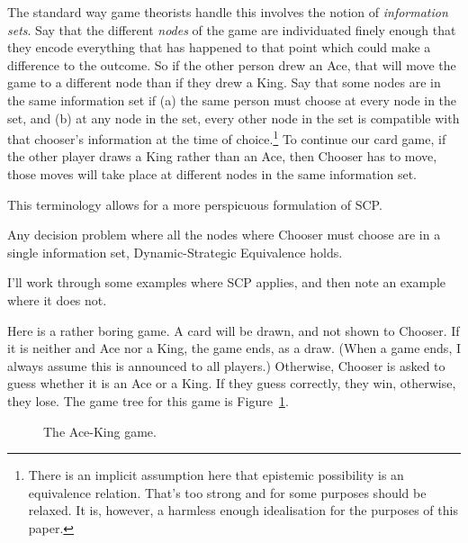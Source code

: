 \documentclass[
  10pt,
  letterpaper,
  DIV=11,
  numbers=noendperiod,
  twoside]{scrartcl}
\providecommand{\tightlist}{%
  \setlength{\itemsep}{0pt}\setlength{\parskip}{0pt}}\usepackage{longtable,booktabs,array}
\begin{document}
The standard way game theorists handle this involves the notion of
\emph{information sets}. Say that the different \emph{nodes} of the game
are individuated finely enough that they encode everything that has
happened to that point which could make a difference to the outcome. So
if the other person drew an Ace, that will move the game to a different
node than if they drew a King. Say that some nodes are in the same
information set if (a) the same person must choose at every node in the
set, and (b) at any node in the set, every other node in the set is
compatible with that chooser's information at the time of
choice.\footnote{There is an implicit assumption here that epistemic
  possibility is an equivalence relation. That's too strong and for some
  purposes should be relaxed. It is, however, a harmless enough
  idealisation for the purposes of this paper.} To continue our card
game, if the other player draws a King rather than an Ace, then Chooser
has to move, those moves will take place at different nodes in the same
information set.

This terminology allows for a more perspicuous formulation of SCP.

\begin{description}
\tightlist
\item[Single Choice Principle]
Any decision problem where all the nodes where Chooser must choose are
in a single information set, Dynamic-Strategic Equivalence holds.
\end{description}

I'll work through some examples where SCP applies, and then note an
example where it does not.

Here is a rather boring game. A card will be drawn, and not shown to
Chooser. If it is neither and Ace nor a King, the game ends, as a draw.
(When a game ends, I always assume this is announced to all players.)
Otherwise, Chooser is asked to guess whether it is an Ace or a King. If
they guess correctly, they win, otherwise, they lose. The game tree for
this game is Figure~\ref{fig-ace-king}.

\begin{figure}


\caption{\label{fig-ace-king}The Ace-King game.}

\end{figure}%
\end{document}
